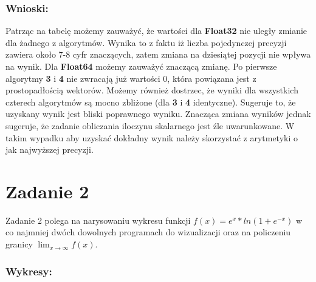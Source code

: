 \documentclass[12pt]{article}
\begin{document}
\subsubsection*{Wnioski:}
Patrząc na tabelę możemy zauważyć, że wartości dla \textbf{Float32} nie uległy zmianie dla żadnego z algorytmów. Wynika to z faktu iż liczba pojedynczej precyzji zawiera około 7-8 cyfr znaczących, zatem zmiana na dziesiątej pozycji nie wpływa na wynik. Dla \textbf{Float64} możemy zauważyć znaczącą zmianę. Po pierwsze algorytmy \textbf{3} i \textbf{4} nie zwracają już wartości 0, która powiązana jest z prostopadłością wektorów. Możemy również dostrzec, że wyniki dla wszystkich czterech algorytmów są mocno zbliżone (dla \textbf{3} i \textbf{4} identyczne). Sugeruje to, że uzyskany wynik jest bliski poprawnego wyniku. Znacząca zmiana wyników jednak sugeruje, że zadanie obliczania iloczynu skalarnego jest źle uwarunkowane. W takim wypadku aby uzyskać dokładny wynik należy skorzystać z arytmetyki o jak najwyższej precyzji.


\section{Zadanie 2}
Zadanie 2 polega na narysowaniu wykresu funkcji $f(x) = e^x*ln(1+e^{-x})$ w co najmniej dwóch dowolnych programach do wizualizacji oraz na policzeniu granicy $ \lim_{x \to \infty} f(x)$.

\newpage
\subsubsection*{Wykresy:}
\end{document}
